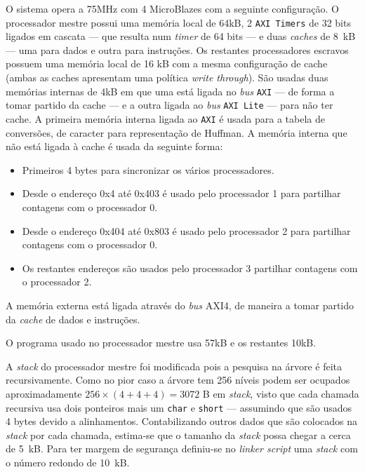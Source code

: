 O sistema opera a 75MHz com 4 MicroBlazes com a seguinte configuração.
O processador mestre possui uma memória local de 64kB, 2 \texttt{AXI~Timers} de 32 bits ligados em cascata --- que resulta num \textit{timer} de 64 bits --- e duas \textit{caches} de 8~kB --- uma para dados e outra para instruções. Os restantes processadores escravos possuem uma memória local de 16 kB com a mesma configuração de cache (ambas as caches apresentam uma política \textit{write through}). São usadas duas memórias internas de 4kB em que uma está ligada no \textit{bus} \texttt{AXI} --- de forma a tomar partido da cache --- e a outra ligada ao \textit{bus} \texttt{AXI Lite} --- para não ter cache. A primeira memória interna ligada ao \texttt{AXI} é usada para a tabela de conversões, de caracter para representação de Huffman. A memória interna que não está ligada à cache é usada da seguinte forma:

\begin{itemize}
\item Primeiros 4 bytes para sincronizar os vários processadores.
\item Desde o endereço 0x4 até 0x403 é usado pelo processador 1 para partilhar contagens com o processador 0.
\item Desde o endereço 0x404 até 0x803 é usado pelo processador 2 para partilhar contagens com o processador 0.
\item Os restantes endereços são usados pelo processador 3 partilhar contagens com o processador 2.
\end{itemize}

A memória externa está ligada através do \textit{bus} AXI4, de maneira a tomar partido da \textit{cache} de dados e instruções.

O programa usado no processador mestre usa 57kB e os restantes 10kB.

A \textit{stack} do processador mestre foi modificada pois a pesquisa na árvore é feita recursivamente. Como no pior caso a árvore tem 256 níveis podem ser ocupados aproximadamente $256 \times (4 + 4 + 4) = 3072$ B em \textit{stack}, visto que cada chamada recursiva usa dois ponteiros mais um \texttt{char} e \texttt{short} --- assumindo que são usados 4 bytes devido a alinhamentos. Contabilizando outros dados que são colocados na \textit{stack} por cada chamada, estima-se que o tamanho da \textit{stack} possa chegar a cerca de 5~kB. Para ter margem de segurança definiu-se no \textit{linker script} uma \textit{stack} com o número redondo de 10~kB.

